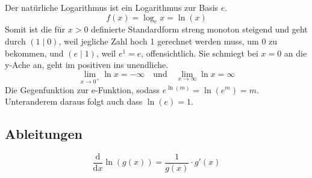 \documentclass{article}
\begin{document}
Der natürliche Logarithmus ist ein Logarithmus zur Basis $e$.
\[
 f(x) = \log_e{x} = \ln{(x)}
\] 
Somit ist die für $x>0$ definierte Standardform streng monoton steigend und geht durch ${(1 \mid 0)}$, weil jegliche Zahl hoch 1 gerechnet werden muss, um 0 zu bekommen, und $(e \mid 1)$, weil $e^1=e$, offensichtlich. \newline
Sie schmiegt bei $x=0$ an die y-Ache an, geht im positiven ins unendliche.
\[
 \lim_{x \to 0^+} \ln x = -\infty
 \quad \text{und} \quad
 \lim_{x \to \infty} \ln x= \infty
\] 
Die Gegenfunktion zur e-Funktion, sodass $e^{\ln(m)}=\ln{(e^m)}=m$. Unteranderem daraus folgt auch dass $\ln(e)=1$.
\subsection{Ableitungen} 
\[
 \frac{\mathrm{d}}{\mathrm{d}x} \ln{(g(x))} = \frac{1}{g(x)} \cdot g'(x) 
\]
 
\end{document}
